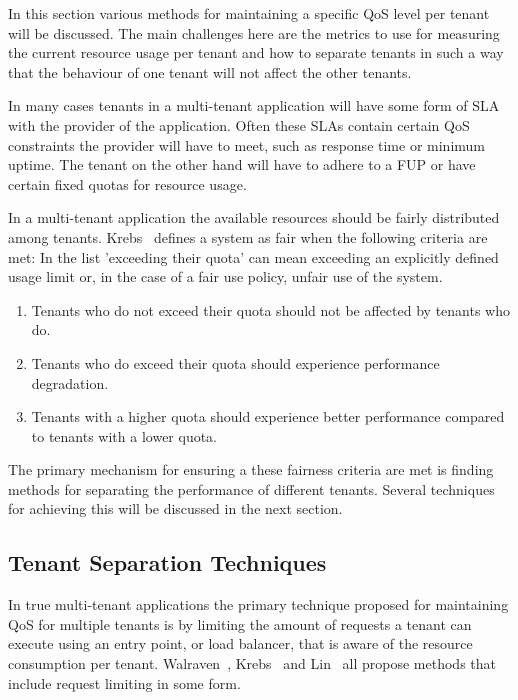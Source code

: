 In this section various methods for maintaining a specific \ac{QoS} level per tenant will be discussed.
The main challenges here are the metrics to use for measuring the current resource usage per tenant and how to separate tenants in such a way that the behaviour of one tenant will not affect the other tenants.~\cite{krebs2013metrics}

In many cases tenants in a multi-tenant application will have some form of \ac{SLA} with the provider of the application.
Often these SLAs contain certain \ac{QoS} constraints the provider will have to meet, such as response time or minimum uptime. 
The tenant on the other hand will have to adhere to a \ac{FUP} or have certain fixed quotas for resource usage.

In a multi-tenant application the available resources should be fairly distributed among tenants.
Krebs~\cite{krebs2013metrics} defines a system as fair when the following criteria are met:
In the list 'exceeding their quota' can mean exceeding an explicitly defined usage limit or, in the case of a fair use policy, unfair use of the system.
\begin{enumerate}
	\item Tenants who do not exceed their quota should not be affected by tenants who do.
	\item Tenants who do exceed their quota should experience performance degradation. 
	\item Tenants with a higher quota should experience better performance compared to tenants with a lower quota.
\end{enumerate}

The primary mechanism for ensuring a these fairness criteria are met is finding methods for separating the performance of different tenants.
Several techniques for achieving this will be discussed in the next section.

\subsection{Tenant Separation Techniques}
In true multi-tenant applications the primary technique proposed for maintaining \ac{QoS} for multiple tenants is by limiting the amount of requests a tenant can execute using an entry point, or load balancer, that is aware of the resource consumption per tenant.
Walraven~\cite{walraven2012towards}, Krebs~\cite{krebs2013metrics} and Lin~\cite{lin2009feedback} all propose methods that include request limiting in some form.

